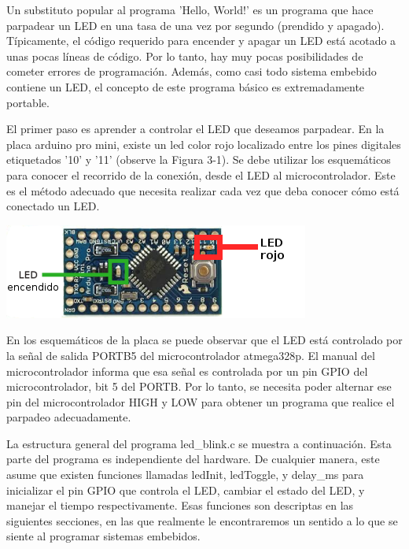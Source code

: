 \documentclass[12pt]{article}
\begin{document}
Un substituto popular al programa 'Hello, World!' es un programa que
hace parpadear un LED en una tasa de una vez por segundo (prendido y apagado).
Típicamente, el código requerido para encender y apagar un LED está
acotado a unas pocas líneas de código. Por lo tanto, hay muy pocas posibilidades
de cometer errores de programación. Además, como casi todo sistema
embebido contiene un LED, el concepto de este programa básico es extremadamente
portable.


El primer paso es aprender a controlar el LED que deseamos parpadear.
En la placa arduino pro mini, existe un led color rojo localizado entre los
pines digitales etiquetados '10' y '11' 
(observe la Figura 3-1). Se debe utilizar los esquemáticos
para conocer el recorrido de la conexión, desde el LED al microcontrolador.
Este es el método adecuado que necesita realizar cada vez que deba
conocer cómo está conectado un LED.

\begin{center}
\includegraphics{led.png}
\end{center}

En los esquemáticos de la placa se puede observar que el LED está controlado por la señal de salida PORTB5 del microcontrolador atmega328p.
El manual del microcontrolador informa que esa señal es controlada por
un pin GPIO del microcontrolador, bit 5 del PORTB. Por lo tanto,
se necesita poder alternar ese pin del microcontrolador HIGH y LOW
para obtener un programa que realice el parpadeo adecuadamente.

La estructura general del programa led\_blink.c se muestra a continuación.
Esta parte del programa es independiente del hardware. De cualquier manera,
este asume que existen funciones llamadas ledInit, ledToggle, y delay\_ms
para inicializar el pin GPIO que controla el LED, cambiar el estado del LED,
y manejar el tiempo respectivamente. Esas funciones son descriptas en las 
siguientes secciones, en las que realmente le encontraremos un
sentido a lo que se siente al programar sistemas embebidos.
\end{document}
